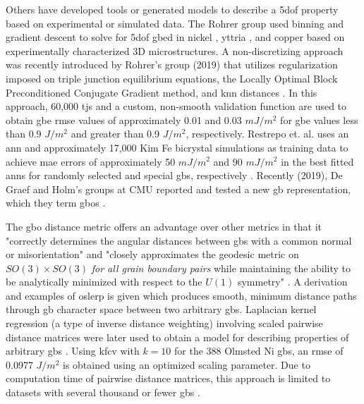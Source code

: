 \documentclass[preprint,12pt]{elsarticle}
\begin{document}
Others have developed tools or generated models to describe a \gls{5dof} property based on experimental or simulated data. The Rohrer group used binning and gradient descent to solve for \gls{5dof} \gls{gbed} in nickel \cite{Li2009RelativeNickel}, yttria \cite{Dillon2009CharacterizationFIB}, and copper \cite{Randle2008Five-parameterCopper} based on experimentally characterized 3D microstructures. A non-discretizing approach was recently introduced by Rohrer's group (2019) that utilizes regularization imposed on triple junction equilibrium equations, the Locally Optimal Block Preconditioned Conjugate Gradient method, and \gls{knn} distances \cite{Shen2019DeterminingSpace}. In this approach, 60,000 \glspl{tj} and a custom, non-smooth validation function are used to obtain \gls{gbe} \gls{rmse} values of approximately 0.01 and 0.03 $mJ/m^2$ for \gls{gbe} values less than 0.9 $J/m^2$ and greater than 0.9 $J/m^2$, respectively. Restrepo et. al. uses an \gls{ann} and approximately 17,000 Kim Fe bicrystal simulations \cite{Kim2011AnDatabase} as training data to achieve \gls{mae} errors of approximately 50 $mJ/m^2$ and 90 $mJ/m^2$ in the best fitted \glspl{ann} for randomly selected and special \glspl{gb}, respectively \cite{EcheverriRestrepo2014UsingEnergies}. Recently (2019), De Graef and Holm's groups at CMU reported and tested a new \gls{gb} representation, which they term \glspl{gbo} \cite{Francis2019ABoundaries,Chesser2020LearningProperties}.

The \gls{gbo} distance metric offers an advantage over other metrics in that it "correctly determines the angular distances between \glspl{gb} with a common normal or misorientation" and "closely approximates the geodesic metric on $SO(3) \times SO(3)$ \textit{for all grain boundary pairs} while maintaining the ability to be analytically minimized with respect to the $U(1)$ symmetry" \cite{Francis2019ABoundaries}. A derivation and examples of \gls{oslerp} is given which produces smooth, minimum distance paths through \gls{gb} character space between two arbitrary \glspl{gb}. Laplacian kernel regression (a type of inverse distance weighting) involving scaled pairwise distance matrices were later used to obtain a model for describing properties of arbitrary \glspl{gb} \cite{Chesser2020LearningProperties}. Using \gls{kfcv} with $k=10$ for the 388 Olmsted Ni \glspl{gb}, an \gls{rmse} of 0.0977 $J/m^2$ is obtained using an optimized scaling parameter. Due to computation time of pairwise distance matrices, this approach is limited to datasets with several thousand or fewer \glspl{gb} \cite{Chesser2020LearningMaterials}.
\end{document}
